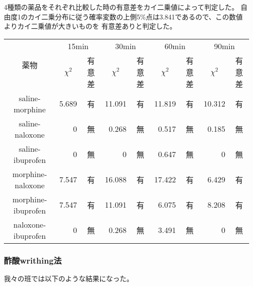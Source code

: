 \documentclass[a4paper,papersize,dvipdfmx]{jsarticle}
\begin{document}
4種類の薬品をそれぞれ比較した時の有意差をカイ二乗値によって判定した。
自由度1のカイ二乗分布に従う確率変数の上側5\%点は3.841であるので、この数値よりカイ二乗値が大きいものを
有意差ありと判定した。

\begin{table}[H]
\centering
\begin{tabular}{|c|r|c|r|c|r|c|r|c|}
\hline
\multirow{2}{*}{薬物} & \multicolumn{2}{c|}{15min}       & \multicolumn{2}{c|}{30min}       & \multicolumn{2}{c|}{60min}       & \multicolumn{2}{c|}{90min}       \\ \cline{2-9}
& \multicolumn{1}{c|}{$\chi^2$} & 有意差 & \multicolumn{1}{c|}{$\chi^2$} & 有意差 & \multicolumn{1}{c|}{$\chi^2$} & 有意差 & \multicolumn{1}{c|}{$\chi^2$} & 有意差 \\ \hline
saline-morphine     & 5.689                      & 有   & 11.091                     & 有   & 11.819                     & 有   & 10.312                     & 有   \\ \hline
saline-naloxone     & 0                          & 無   & 0.268                      & 無   & 0.517                      & 無   & 0.185                      & 無   \\ \hline
saline-ibuprofen    & 0                          & 無   & 0                          & 無   & 0.647                      & 無   & 0                          & 無   \\ \hline
morphine-naloxone   & 7.547                      & 有   & 16.088                     & 有   & 17.422                     & 有   & 6.429                      & 有   \\ \hline
morphine-ibuprofen  & 7.547                      & 有   & 11.091                     & 有   & 6.075                      & 有   & 8.208                      & 有   \\ \hline
naloxone-ibuprofen  & 0                          & 無   & 0.268                      & 無   & 3.491                      & 無   & 0                          & 無   \\ \hline
\end{tabular}
\end{table}




\subsubsection*{酢酸writhing法}

我々の班では以下のような結果になった。
\end{document}
